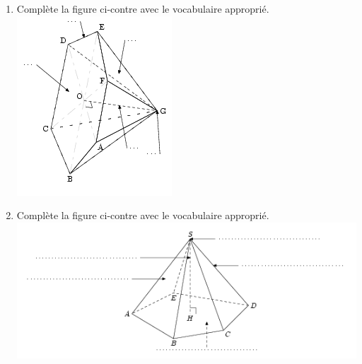
\begin{enumerate}
\item \begin{multicols}{2} 
Complète la figure ci-contre avec le vocabulaire approprié.\\
\includegraphics[scale=1]{RepS-52.png}
\end{multicols}
\item \begin{multicols}{2} 
Complète la figure ci-contre avec le vocabulaire approprié.\\
\includegraphics[scale=1]{RepS-52b.png}
\end{multicols}
\end{enumerate}